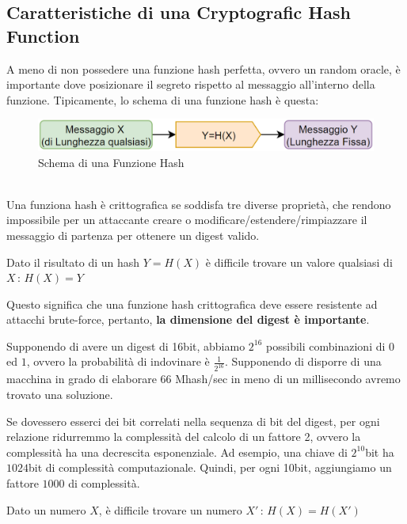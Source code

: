 \subsection{Caratteristiche di una Cryptografic Hash Function}
A meno di non possedere una funzione hash perfetta, ovvero un random oracle, è importante dove posizionare il segreto rispetto al messaggio all'interno della funzione. Tipicamente, lo schema di una funzione hash è questa:
\begin{figure}[h]
    \centering
    \includegraphics[width=\textwidth]{image/hashscheme.png}
    \caption{Schema di una Funzione Hash}
    \label{fig:hashscheme}
\end{figure}\\
Una funziona hash è crittografica se soddisfa tre diverse proprietà, che rendono impossibile per un attaccante creare o modificare/estendere/rimpiazzare il messaggio di partenza per ottenere un digest valido. 
\begin{theorem}\label{thm:preimageres}
Dato il risultato di un hash $Y=H(X)$ è difficile trovare un valore qualsiasi di $X\,:\,H(X)=Y$
\end{theorem}
Questo significa che una funzione hash crittografica deve essere resistente ad attacchi brute-force, pertanto, \textbf{la dimensione del digest è importante}. 
\begin{example}
Supponendo di avere un digest di 16bit, abbiamo $2^{16}$ possibili combinazioni di $0$ ed $1$, ovvero la probabilità di indovinare è $\frac{1}{2^{16}}$. Supponendo di disporre di una macchina in grado di elaborare $66$ Mhash/sec in meno di un millisecondo avremo trovato una soluzione.
\end{example}
\begin{remark}
Se dovessero esserci dei bit correlati nella sequenza di bit del digest, per ogni relazione ridurremmo la complessità del calcolo di un fattore 2, ovvero la complessità ha una decrescita esponenziale. Ad esempio, una chiave di $2^{10}$bit ha $1024$bit di complessità computazionale. Quindi, per ogni 10bit, aggiungiamo un fattore $1000$ di complessità.
\end{remark}
\begin{theorem}\label{thm:weakcollres}
Dato un numero $X$, è difficile trovare un numero $X'\,:\,H(X)=H(X')$
\end{theorem}
